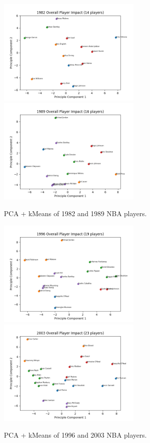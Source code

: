 \documentclass{article}
\begin{document}
\begin{figure}[h]
  \includegraphics[width=7cm]{1982_Graphs/PCA_Overall_1982.png}
  \includegraphics[width=7cm]{1989_Graphs/PCA_Overall_1989.png}
  \caption{PCA + kMeans of 1982 and 1989 NBA players.}
\end{figure}

\begin{figure}[h]
  \includegraphics[width=7cm]{1996_Graphs/PCA_Overall_1996.png}
  \includegraphics[width=7cm]{2003_Graphs/PCA_Overall_2003.png}
  \caption{PCA + kMeans of 1996 and 2003 NBA players.}
\end{figure}
\end{document}
